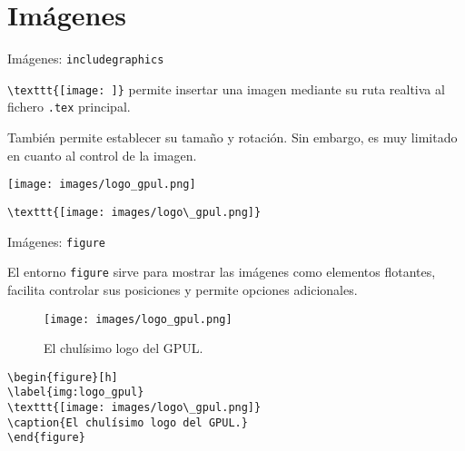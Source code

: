 \section{Imágenes}

\begin{frame}[fragile]{Imágenes: \texttt{includegraphics}}
\label{frame:imagenes}

\verb|\texttt{[image: ]}| permite insertar una imagen mediante su ruta realtiva al fichero \texttt{.tex} principal. 

\vspace{0.5cm}

También permite establecer su tamaño y rotación. Sin embargo, es muy limitado en cuanto al control de la imagen.

\texttt{[image: images/logo\_gpul.png]}

\begin{verbatim}
\texttt{[image: images/logo\_gpul.png]}
\end{verbatim}
\end{frame}


\begin{frame}[fragile]{Imágenes: \texttt{figure}}

El entorno \texttt{figure} sirve para mostrar las imágenes como elementos flotantes, facilita controlar sus posiciones y permite opciones adicionales.

\begin{figure}[h]
\label{img:logo_gpul}
\texttt{[image: images/logo\_gpul.png]}
\caption{El chulísimo logo del GPUL.}
\end{figure}

\begin{verbatim}
\begin{figure}[h]
\label{img:logo_gpul}
\texttt{[image: images/logo\_gpul.png]}
\caption{El chulísimo logo del GPUL.}
\end{figure}
\end{verbatim}

\end{frame}
